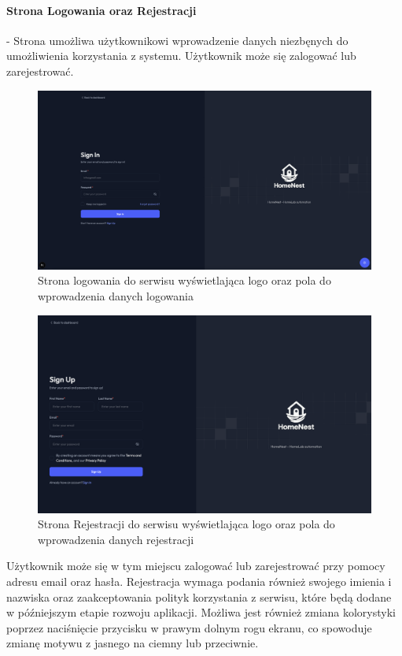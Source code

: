 \paragraph{Strona Logowania oraz Rejestracji} - Strona umożliwa użytkownikowi wprowadzenie danych niezbęnych do umożliwienia korzystania z systemu. Użytkownik może się zalogować lub zarejestrować.
\begin{figure}[H]
  \centering
  \includegraphics[width=1\textwidth]{./chapters/assets/login_page.png}
  \caption{Strona logowania do serwisu wyświetlająca logo oraz pola do wprowadzenia danych logowania}
  \label{fig:ui_login}
\end{figure}

\begin{figure}[H]
  \centering
  \includegraphics[width=1\textwidth]{./chapters/assets/signup_page.png}
  \caption{Strona Rejestracji do serwisu wyświetlająca logo oraz pola do wprowadzenia danych rejestracji}
  \label{fig:ui_signup}
\end{figure}
Użytkownik może się w tym miejscu zalogować lub zarejestrować przy pomocy adresu email oraz hasła. Rejestracja wymaga podania również swojego imienia i nazwiska oraz zaakceptowania polityk korzystania z serwisu, które będą dodane w późniejszym etapie rozwoju aplikacji.
Możliwa jest również zmiana kolorystyki poprzez naciśnięcie przycisku w prawym dolnym rogu ekranu, co spowoduje zmianę motywu z jasnego na ciemny lub przeciwnie.

